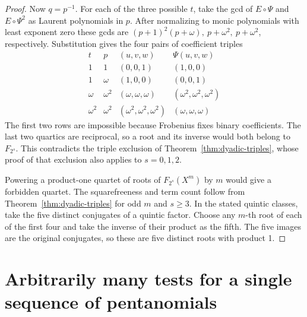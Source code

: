 \documentclass[11pt]{article}
\begin{document}
\begin{proof}
Now \(q=p^{-1}\). For each of the three possible \(t\), take the gcd
of \(E\circ\Psi\) and \(E\circ\Psi^2\) as Laurent polynomials in \(p\).
After normalizing to monic polynomials with least exponent zero these
gcds are \((p+1)^2(p+\omega),\ p+\omega^2,\ p+\omega^2\), respectively.
Substitution gives the four pairs of coefficient triples
\[
\begin{array}{cc|c|c}
t&p&(u,v,w)&\Psi(u,v,w)\\\hline
1&1&(0,0,1)&(1,0,0)\\
1&\omega&(1,0,0)&(0,0,1)\\
\omega&\omega^2&(\omega,\omega,\omega)&(\omega^2,\omega^2,\omega^2)\\
\omega^2&\omega^2&(\omega^2,\omega^2,\omega^2)&(\omega,\omega,\omega)
\end{array}
\]
The first two rows are impossible because Frobenius fixes binary
coefficients. The last two quartics are reciprocal, so a root and
its inverse would both belong to \(F_{2^s}\). This contradicts the
triple exclusion of Theorem~\ref{thm:dyadic-triples}, whose proof
of that exclusion also applies to \(s=0,1,2\).

Powering a product-one quartet of roots of \(F_{2^s}(X^m)\) by \(m\)
would give a forbidden quartet. The squarefreeness and term count
follow from Theorem~\ref{thm:dyadic-triples} for odd \(m\) and \(s\ge3\).
In the stated quintic classes, take the five distinct conjugates of a
quintic factor. Choose any \(m\)-th root of each of the first four and
take the inverse of their product as the fifth. The five images are
the original conjugates, so these are five distinct roots with product 1.
\end{proof}

\section{Arbitrarily many tests for a single sequence of pentanomials}
\end{document}
